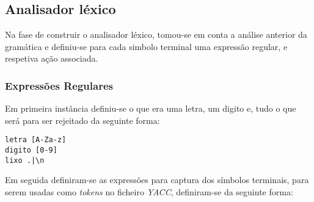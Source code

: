 \subsection{Analisador léxico}
\label{subsec:lexico:desenho}


Na fase de construir o analisador léxico, tomou-se em conta a análise anterior
da gramática e definiu-se para cada simbolo terminal uma expressão regular,
e respetiva ação associada.


\subsubsection{Expressões Regulares}
\label{subsec:subsubsec:ers:desenho}

Em primeira instância definiu-se o que era uma letra, um digito e, tudo o que
será para ser rejeitado da seguinte forma:


\begin{verbatim}
letra [A-Za-z]
digito [0-9]
lixo .|\n
\end{verbatim}


Em seguida definiram-se as expressões para captura dos símbolos terminais, para
serem usadas como \emph{tokens} no ficheiro \emph{YACC}, definiram-se da
seguinte forma:


